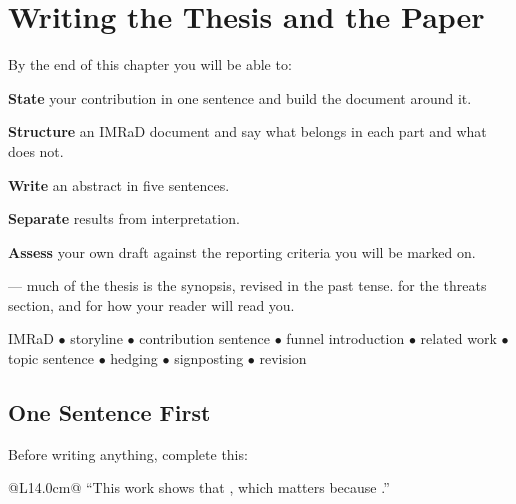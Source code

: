 \chapter{Writing the Thesis and the Paper}\label{ch:writing}

\begin{outcomes}
By the end of this chapter you will be able to:
\begin{tight}
  \item \textbf{State} your contribution in one sentence and build the document
    around it.
  \item \textbf{Structure} an IMRaD document and say what belongs in each part
    and what does not.
  \item \textbf{Write} an abstract in five sentences.
  \item \textbf{Separate} results from interpretation.
  \item \textbf{Assess} your own draft against the reporting criteria you will
    be marked on.
\end{tight}
\end{outcomes}

\begin{prereq}
 --- much of the thesis is the synopsis, revised in the past
tense.  for the threats section, and  for how
your reader will read you.
\end{prereq}

\begin{keyterms}
IMRaD $\bullet$ storyline $\bullet$ contribution sentence $\bullet$ funnel
introduction $\bullet$ related work $\bullet$ topic sentence $\bullet$ hedging
$\bullet$ signposting $\bullet$ revision
\end{keyterms}

\section{One Sentence First}

Before writing anything, complete this:

\begin{center}
\small
\begin{tabular}{@{}L{14.0cm}@{}}
\toprule
``This work shows that \underline{\hspace{60mm}}, which matters because
\underline{\hspace{45mm}}.'' \\
\bottomrule
\end{tabular}
\end{center}


